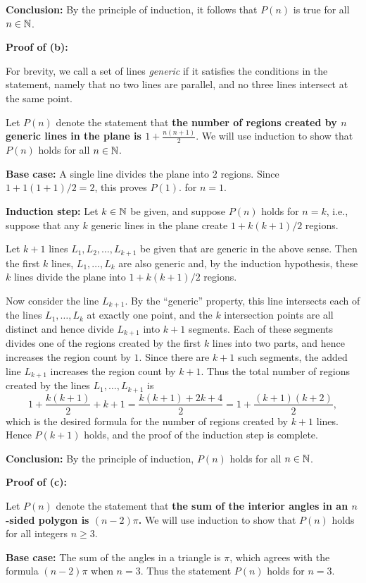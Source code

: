 \textbf{Conclusion:}
By the principle of induction, it follows that
$P(n)$  is true for all $n\in\mathbb{N}$.

\textbf{Proof of (b):}

For brevity, we call a set of lines \emph{generic} if it satisfies the
conditions in the statement, namely that no two lines are parallel, and no
three lines intersect at the same point.

Let $P(n)$ denote the statement that 
\textbf{the number of regions created by $n$ generic lines in the plane is
$1+\frac{n(n+1)}{2}$}. 
We will use induction to show that $P(n)$ holds for all $n\in\mathbb{N}$.


\textbf{Base case:} A single line divides the plane into $2$ regions. Since 
$1+1(1+1)/2=2$, this proves $P(1)$.
for $n=1$. 

\textbf{Induction step:} Let $k\in\mathbb{N}$ be given, and suppose $P(n)$
holds for $n=k$, i.e., suppose that any $k$ generic lines in the plane create
$1+k(k+1)/2$ regions.  

Let $k+1$ lines $L_1,L_2,\dots,L_{k+1}$ be given that are generic in the above
sense.  Then the first $k$ lines, $L_1,\dots,L_k$ are also generic and, by the
induction hypothesis, these $k$ lines divide the plane into $1+k(k+1)/2$
regions.

Now consider the line $L_{k+1}$.  By the ``generic'' property, this line
 intersects each of the lines $L_1,\dots,L_k$ at exactly one point,
and the $k$ intersection points are all distinct and hence divide $L_{k+1}$
into $k+1$ segments.  Each of these segments divides one of the regions created
by the first $k$ lines into two parts, and hence increases the region count by
$1$.  Since there are $k+1$ such segments, the added line $L_{k+1}$ increases
the region count by $k+1$. Thus the total number of regions created by
the lines $L_1,\dots,L_{k+1}$ is  
\[
1+\frac{k(k+1)}{2}+k+1=\frac{k(k+1)+2k+4}{2}=1+\frac{(k+1)(k+2)}{2},
\]
which is the desired formula for the number of regions created by $k+1$
lines.  Hence $P(k+1)$ holds, and the proof of the induction step is
complete.

\textbf{Conclusion:} By the principle of induction, $P(n)$ holds for all
$n\in\mathbb{N}$.

\textbf{Proof of (c):}

Let $P(n)$ denote the statement that \textbf{the sum of the interior
angles in an $n$-sided polygon is $(n-2)\pi$.}
We will use induction to show that $P(n)$ holds for 
all integers $n\ge3$.


\textbf{Base case:} The sum of the angles in a triangle is $\pi$, which
agrees with the formula 
$(n-2)\pi$ when $n=3$. Thus the statement $P(n)$
holds for $n=3$. 

